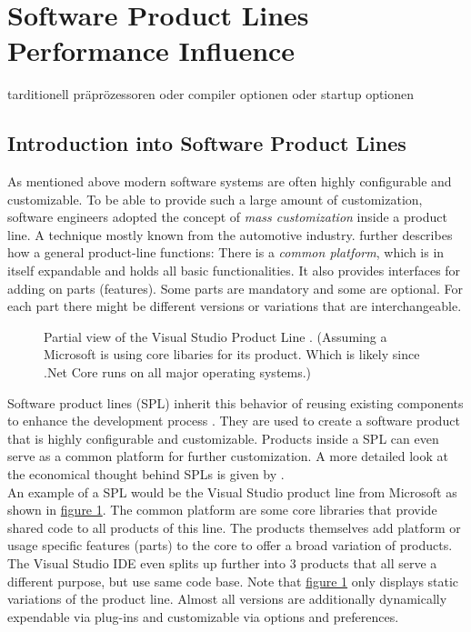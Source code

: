 \section{Software Product Lines Performance Influence}

tarditionell präprözessoren oder compiler optionen oder startup optionen

\subsection{Introduction into Software Product Lines}

As mentioned above modern software systems are often highly configurable and customizable. To be able to provide such a large amount of customization, software engineers adopted the concept of \textit{mass customization} inside a product line. A technique mostly known from the automotive industry\cite{SPLEngineering}.\cite{SPLEngineering} further describes how a general product-line functions: There is a \textit{common platform}, which is in itself expandable and holds all basic functionalities. It also provides interfaces for adding on parts (features). Some parts are mandatory and some are optional. For each part there might be different versions or variations that are interchangeable.\\

\begin{figure}%
	\centering
	\label{fig:VSSPL}
	\setlength\belowcaptionskip{-\baselineskip}
	\captionsetup{width=0.95\linewidth}
	
	\caption{Partial view of the Visual Studio Product Line \cite{VisualStudioSPL}. (Assuming a Microsoft is using core libaries for its product. Which is likely since .Net Core runs on all major operating systems.) }
\end{figure}\noindent
Software product lines (SPL) inherit this behavior of reusing existing components to enhance the development process \cite{IssuesAndModelsInSPL}. They are used to create a software product that is highly configurable and customizable. Products inside a SPL can even serve as a common platform for further customization. A more detailed look at the economical thought behind SPLs is given by \citet{IssuesAndModelsInSPL}.\\
An example of a SPL would be the Visual Studio product line from Microsoft as shown in \hyperref[fig:VSSPL]{figure 1}. The common platform are some core libraries that provide shared code to all products of this line. The products themselves add platform or usage specific features (parts) to the core to offer a broad variation of products. The Visual Studio IDE even splits up further into 3 products that all serve a different purpose, but use same code base. Note that \hyperref[fig:VSSPL]{figure 1} only displays static variations of the product line. Almost all versions are additionally dynamically expendable via plug-ins and customizable via options and preferences.

